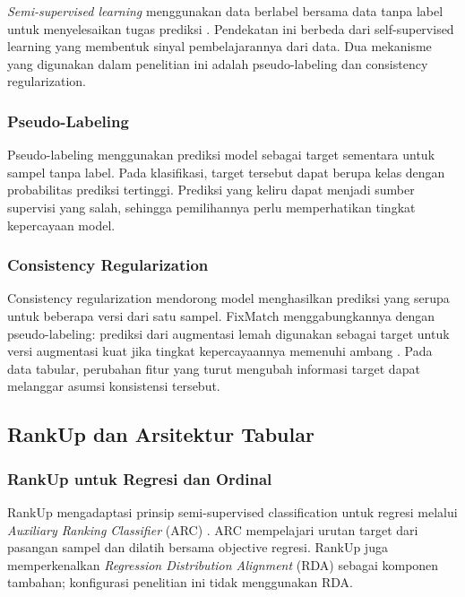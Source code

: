 \textit{Semi-supervised learning} menggunakan data berlabel bersama data tanpa label untuk menyelesaikan tugas prediksi \cite{ref8}. Pendekatan ini berbeda dari self-supervised learning yang membentuk sinyal pembelajarannya dari data. Dua mekanisme yang digunakan dalam penelitian ini adalah pseudo-labeling dan consistency regularization.

\subsubsection{Pseudo-Labeling}

Pseudo-labeling menggunakan prediksi model sebagai target sementara untuk sampel tanpa label. Pada klasifikasi, target tersebut dapat berupa kelas dengan probabilitas prediksi tertinggi. Prediksi yang keliru dapat menjadi sumber supervisi yang salah, sehingga pemilihannya perlu memperhatikan tingkat kepercayaan model.

\subsubsection{Consistency Regularization}

Consistency regularization mendorong model menghasilkan prediksi yang serupa untuk beberapa versi dari satu sampel. FixMatch menggabungkannya dengan pseudo-labeling: prediksi dari augmentasi lemah digunakan sebagai target untuk versi augmentasi kuat jika tingkat kepercayaannya memenuhi ambang \cite{ref9}. Pada data tabular, perubahan fitur yang turut mengubah informasi target dapat melanggar asumsi konsistensi tersebut.

\subsection{RankUp dan Arsitektur Tabular}

\subsubsection{RankUp untuk Regresi dan Ordinal}

RankUp mengadaptasi prinsip semi-supervised classification untuk regresi melalui \textit{Auxiliary Ranking Classifier} (ARC) \cite{ref10}. ARC mempelajari urutan target dari pasangan sampel dan dilatih bersama objective regresi. RankUp juga memperkenalkan \textit{Regression Distribution Alignment} (RDA) sebagai komponen tambahan; konfigurasi penelitian ini tidak menggunakan RDA.

